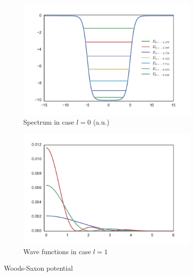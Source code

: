 \documentclass[a4paper, 11pt]{article}
\begin{document}
\begin{figure}[h!] 
\centering
\begin{subfigure}{.5\textwidth}
  \centering
  \includegraphics[width=1.0\linewidth]{WS_poten.pdf}
  \caption{Spectrum in case $l=0$ (a.u.)}
\end{subfigure}%
\begin{subfigure}{.5\textwidth}
  \centering
  \includegraphics[width=1.0\linewidth]{WS_wave.pdf}
  \caption{Wave functions in case $l=1$}
\end{subfigure}
\caption{Woods-Saxon potential}
\label{fig:WS_potential1}
\end{figure}
\end{document}
